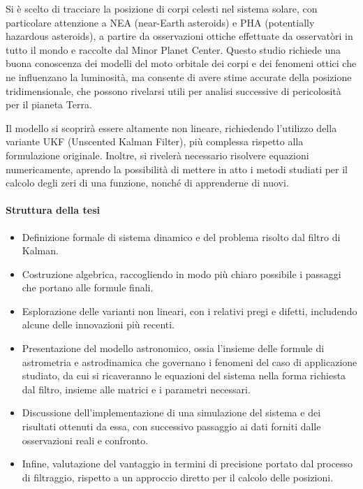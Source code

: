 \documentclass[12pt,a4paper,openright,twoside]{book}
\begin{document}
Si è scelto di tracciare la posizione di corpi celesti nel sistema solare, con particolare attenzione a NEA (near-Earth asteroids) e PHA (potentially hazardous asteroids), a partire da osservazioni ottiche effettuate da osservatòri in tutto il mondo e raccolte dal Minor Planet Center. Questo studio richiede una buona conoscenza dei modelli del moto orbitale dei corpi e dei fenomeni ottici che ne influenzano la luminosità, ma consente di avere stime accurate della posizione tridimensionale, che possono rivelarsi utili per analisi successive di pericolosità per il pianeta Terra.

Il modello si scoprirà essere altamente non lineare, richiedendo l'utilizzo della variante UKF (Unscented Kalman Filter), più complessa rispetto alla formulazione originale. Inoltre, si rivelerà necessario risolvere equazioni numericamente, aprendo la possibilità di mettere in atto i metodi studiati per il calcolo degli zeri di una funzione, nonché di apprenderne di nuovi.

\paragraph{Struttura della tesi}

\begin{itemize}
\item Definizione formale di sistema dinamico e del problema risolto dal filtro di Kalman.
\item Costruzione algebrica, raccogliendo in modo più chiaro possibile i passaggi che portano alle formule finali.
\item Esplorazione delle varianti non lineari, con i relativi pregi e difetti, includendo alcune delle innovazioni più recenti.
\item Presentazione del modello astronomico, ossia l'insieme delle formule di astrometria e astrodinamica che governano i fenomeni del caso di applicazione studiato, da cui si ricaveranno le equazioni del sistema nella forma richiesta dal filtro, insieme alle matrici e i parametri necessari.
\item Discussione dell'implementazione di una simulazione del sistema e dei risultati ottenuti da essa, con successivo passaggio ai dati forniti dalle osservazioni reali e confronto.
\item Infine, valutazione del vantaggio in termini di precisione portato dal processo di filtraggio, rispetto a un approccio diretto per il calcolo delle posizioni.
\end{itemize}
\end{document}
